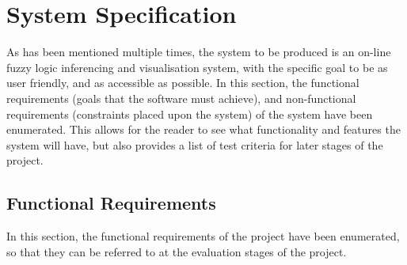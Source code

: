 \section{System Specification}
\label{sec:spec}
As has been mentioned multiple times, the system to be produced is an on-line fuzzy logic inferencing and visualisation system, with the specific goal to be as user friendly, and as accessible as possible. In this section, the functional requirements (goals that the software must achieve), and non-functional requirements (constraints placed upon the system) of the system have been enumerated. This allows for the reader to see what functionality and features the system will have, but also provides a list of test criteria for later stages of the project.

\subsection{Functional Requirements}

In this section, the functional requirements of the project have been enumerated, so that they can be referred to at the evaluation stages of the project.

